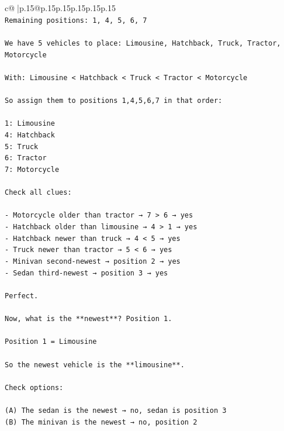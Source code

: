 \documentclass{article}
\begin{document}
{\begin{supertabular}{c@{$\;$}|p{.15\linewidth}@{}p{.15\linewidth}p{.15\linewidth}p{.15\linewidth}p{.15\linewidth}p{.15\linewidth}}
{{{\\ 
\texttt{Remaining positions: 1, 4, 5, 6, 7} \\
\\ 
\texttt{We have 5 vehicles to place: Limousine, Hatchback, Truck, Tractor, Motorcycle} \\
\\ 
\texttt{With: Limousine < Hatchback < Truck < Tractor < Motorcycle} \\
\\ 
\texttt{So assign them to positions 1,4,5,6,7 in that order:} \\
\\ 
\texttt{1: Limousine  } \\
\texttt{4: Hatchback  } \\
\texttt{5: Truck  } \\
\texttt{6: Tractor  } \\
\texttt{7: Motorcycle} \\
\\ 
\texttt{Check all clues:} \\
\\ 
\texttt{{-} Motorcycle older than tractor → 7 > 6 → yes  } \\
\texttt{{-} Hatchback older than limousine → 4 > 1 → yes  } \\
\texttt{{-} Hatchback newer than truck → 4 < 5 → yes  } \\
\texttt{{-} Truck newer than tractor → 5 < 6 → yes  } \\
\texttt{{-} Minivan second{-}newest → position 2 → yes  } \\
\texttt{{-} Sedan third{-}newest → position 3 → yes} \\
\\ 
\texttt{Perfect.} \\
\\ 
\texttt{Now, what is the **newest**? Position 1.} \\
\\ 
\texttt{Position 1 = Limousine} \\
\\ 
\texttt{So the newest vehicle is the **limousine**.} \\
\\ 
\texttt{Check options:} \\
\\ 
\texttt{(A) The sedan is the newest → no, sedan is position 3  } \\
\texttt{(B) The minivan is the newest → no, position 2  } \\
}}}
\end{supertabular}}
\end{document}
